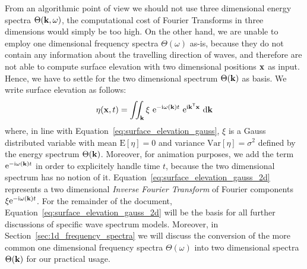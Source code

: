 From an algorithmic point of view we should not use three dimensional
energy spectra $\Theta(\mathbf{k},\omega)$, the computational cost of
Fourier Transforms in three dimensions would simply be too high.
On the other hand, we are unable to employ one dimensional frequency spectra
$\Theta(\omega)$ as-is, because they do not contain any information about
the  travelling direction of waves, and therefore are not able to compute 
surface elevation with two dimensional positions $\mathbf{x}$ as input.
Hence, we have to settle for the two dimensional \wavenumber spectrum
$\Theta(\mathbf{k})$ as basis. We write surface elevation as follows:
\begin{equation}
\label{eq:surface_elevation_gauss_2d}
 \eta(\mathbf{x}, t) = \iint_{\mathbf{k}} 
\xi~\mathrm{e}^{-\mathrm{i}\omega(\mathbf{k}) t}
~\mathrm{e}^{\mathrm{i}\mathbf{k}^{\mathsf{T}}\mathbf{x}}~\mathrm{d}\mathbf{k}
\end{equation}
where, in line with Equation~\ref{eq:surface_elevation_gauss}, $\xi$ is 
a Gauss distributed variable with mean $\mathrm{E}[\eta] = 0$ and
variance $\mathrm{Var}[\eta] = \sigma^2$ defined by the energy spectrum
$\Theta(\mathbf{k})$. Moreover, for animation purposes, we add the term 
$\mathrm{e}^{-\mathrm{i}\omega(\mathbf{k}) t}$ in order to explicitely handle 
time $t$, because the two dimensional \wavenumber spectrum has no notion of 
it. Equation~\ref{eq:surface_elevation_gauss_2d} represents a two dimensional 
\emph{Inverse Fourier Transform} of Fourier components 
$\xi\mathrm{e}^{-\mathrm{i}\omega(\mathbf{k}) t}$. For the remainder of the 
document, Equation~\ref{eq:surface_elevation_gauss_2d} will be the basis for all 
further discussions of specific wave spectrum models. Moreover, in 
Section~\ref{sec:1d_frequency_spectra} we will discuss the conversion of the 
more common one dimensional frequency spectra $\Theta(\omega)$ into two 
dimensional \wavenumber spectra $\Theta(\mathbf{k})$ for our practical usage.
%
